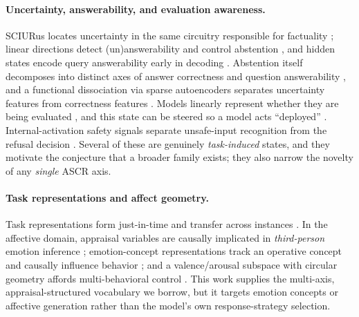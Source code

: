 \documentclass[11pt]{article}
\begin{document}
\paragraph{Uncertainty, answerability, and evaluation awareness.}
SCIURus locates uncertainty in the same circuitry responsible for factuality
\citep{teplica2025sciurus}; linear directions detect (un)answerability and control
abstention \citep{lavi2025unanswerability}, and hidden states encode query
answerability early in decoding \citep{slobodkin2023unanswerability}. Abstention
itself decomposes into distinct axes of answer correctness and question
answerability \citep{wagner2026twoaxes}, and a functional dissociation via sparse
autoencoders separates uncertainty features from correctness features
\citep{patel2026uncertaintycorrectness}. Models linearly represent whether they
are being evaluated \citep{nguyen2025evalaware}, and this state can be steered so a
model acts ``deployed'' \citep{hua2025evaldeployed}. Internal-activation safety
signals separate unsafe-input recognition from the refusal decision
\citep{han2025safeswitch}. Several of these are genuinely \emph{task-induced}
states, and they motivate the conjecture that a broader family exists; they also
narrow the novelty of any \emph{single} ASCR axis.

\paragraph{Task representations and affect geometry.}
Task representations form just-in-time and transfer across instances
\citep{li2025taskrepr}. In the affective domain, appraisal variables are causally
implicated in \emph{third-person} emotion inference \citep{tak2025emotioninfer};
emotion-concept representations track an operative concept and causally influence
behavior \citep{sofroniew2026emotion}; and a valence/arousal subspace with circular
geometry affords multi-behavioral control \citep{sun2026valencearousal}. This work
supplies the multi-axis, appraisal-structured vocabulary we borrow, but it targets
emotion concepts or affective generation rather than the model's own
response-strategy selection.
\end{document}
